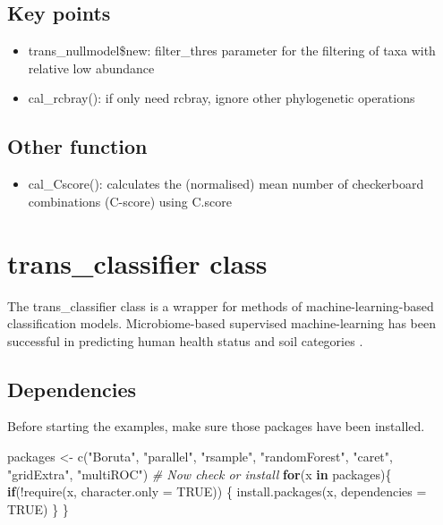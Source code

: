 \documentclass[
]{book}
\newenvironment{Shaded}{\begin{snugshade}}{\end{snugshade}}
\newcommand{\AttributeTok}[1]{\textcolor[rgb]{0.77,0.63,0.00}{#1}}
\newcommand{\CommentTok}[1]{\textcolor[rgb]{0.56,0.35,0.01}{\textit{#1}}}
\newcommand{\ConstantTok}[1]{\textcolor[rgb]{0.00,0.00,0.00}{#1}}
\newcommand{\ControlFlowTok}[1]{\textcolor[rgb]{0.13,0.29,0.53}{\textbf{#1}}}
\newcommand{\FunctionTok}[1]{\textcolor[rgb]{0.00,0.00,0.00}{#1}}
\newcommand{\NormalTok}[1]{#1}
\newcommand{\OtherTok}[1]{\textcolor[rgb]{0.56,0.35,0.01}{#1}}
\newcommand{\SpecialCharTok}[1]{\textcolor[rgb]{0.00,0.00,0.00}{#1}}
\newcommand{\StringTok}[1]{\textcolor[rgb]{0.31,0.60,0.02}{#1}}
\providecommand{\tightlist}{%
  \setlength{\itemsep}{0pt}\setlength{\parskip}{0pt}}
\begin{document}
\hypertarget{key-points-7}{%
\subsection{Key points}\label{key-points-7}}

\begin{itemize}
\tightlist
\item
  trans\_nullmodel\$new: filter\_thres parameter for the filtering of taxa with relative low abundance
\item
  cal\_rcbray(): if only need rcbray, ignore other phylogenetic operations
\end{itemize}

\hypertarget{other-function}{%
\subsection{Other function}\label{other-function}}

\begin{itemize}
\tightlist
\item
  cal\_Cscore(): calculates the (normalised) mean number of checkerboard combinations (C-score) using C.score
\end{itemize}

\hypertarget{trans_classifier-class}{%
\section{trans\_classifier class}\label{trans_classifier-class}}

The trans\_classifier class is a wrapper for methods of machine-learning-based classification models.
Microbiome-based supervised machine-learning has been successful in predicting human health status \citep{Poore_Microbiome_2020}
and soil categories \citep{Wilhelm_Predicting_2021}.

\hypertarget{dependencies}{%
\subsection{Dependencies}\label{dependencies}}

Before starting the examples, make sure those packages have been installed.

\begin{Shaded}
\begin{Highlighting}[]
\NormalTok{packages }\OtherTok{\textless{}{-}} \FunctionTok{c}\NormalTok{(}\StringTok{"Boruta"}\NormalTok{, }\StringTok{"parallel"}\NormalTok{, }\StringTok{"rsample"}\NormalTok{, }\StringTok{"randomForest"}\NormalTok{, }\StringTok{"caret"}\NormalTok{, }\StringTok{"gridExtra"}\NormalTok{, }\StringTok{"multiROC"}\NormalTok{)}
\CommentTok{\# Now check or install}
\ControlFlowTok{for}\NormalTok{(x }\ControlFlowTok{in}\NormalTok{ packages)\{}
    \ControlFlowTok{if}\NormalTok{(}\SpecialCharTok{!}\FunctionTok{require}\NormalTok{(x, }\AttributeTok{character.only =} \ConstantTok{TRUE}\NormalTok{)) \{}
        \FunctionTok{install.packages}\NormalTok{(x, }\AttributeTok{dependencies =} \ConstantTok{TRUE}\NormalTok{)}
\NormalTok{    \}}
\NormalTok{\}}
\end{Highlighting}
\end{Shaded}
\end{document}
